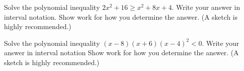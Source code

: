\documentclass[11pt,addpoints,answers]{exam}
\begin{document}
\begin{questions}
\begin{multicols}{2}

\columnbreak

\begin{flushright}\end{flushright}

\end{multicols}

  \vfill
\pagestyle{empty}

\newpage

\question[12] Solve the polynomial inequality $2x^2+16\geq x^2+8x+4$.  Write your answer in interval notation.  Show work for how you determine the answer.  (A sketch is highly recommended.)


\vspace*{1.5in}

\begin{flushright}

\end{flushright}

\question[12] Solve the polynomial inequality $(x-8)(x+6)(x-4)^2<0$.  Write your answer in interval notation  Show work for how you determine the answer.  (A sketch is highly recommended.)


\vspace*{1.5in}

\begin{flushright}

\end{flushright}


\end{questions}
\end{document}
